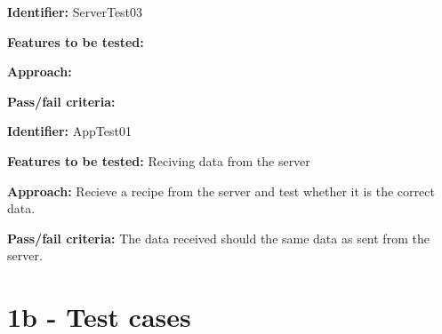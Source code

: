 \documentclass[a4paper,12pt]{memoir}
\newcommand{\testdesign}[4]
{
\begin{framed}
\begin{description}
\item \textbf{Identifier:} #1
\item \textbf{Features to be tested:} #2
\item \textbf{Approach:} #3
\item \textbf{Pass/fail criteria:} #4
\end{description}
\end{framed}
}
\begin{document}
\testdesign
{ServerTest03} %
{} %
{} %
{} %

\testdesign
{AppTest01} %
{Reciving data from the server} %
{Recieve a recipe from the server and test whether it is the correct data.} %
{The data received should the same data as sent from the server.} %

\section*{1b - Test cases}
\end{document}
